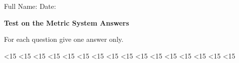 \documentclass{./units4school}
\begin{document}
Full Name: %
\raisebox{-2pt}{\rule[-.4ex]{5cm}{.4pt}}\hfill%
Date: %
\raisebox{-2pt}{\rule[-.4ex]{3cm}{.4pt}}
\hspace*{.5cm}%


\vspace{6mm}
\textbf{\large Test on the Metric System \ifprintanswers \hfill \textcolor{AccentColor}{Answers}
\fi
}%
\vspace{3mm}

For each question give one answer only.








\ifnum\theexerciseID<15 {} \fi
\ifnum\theexerciseID<15 {} \fi
\ifnum\theexerciseID<15 {} \fi
\ifnum\theexerciseID<15 {} \fi
\ifnum\theexerciseID<15 {} \fi
\ifnum\theexerciseID<15 {} \fi
\ifnum\theexerciseID<15 {} \fi
\ifnum\theexerciseID<15 {} \fi
\ifnum\theexerciseID<15 {} \fi
\ifnum\theexerciseID<15 {} \fi
\ifnum\theexerciseID<15 {} \fi
\ifnum\theexerciseID<15 {} \fi
\ifnum\theexerciseID<15 {} \fi
\ifnum\theexerciseID<15 {} \fi
\ifnum\theexerciseID<15 {} \fi
\ifnum\theexerciseID<15 {} \fi
\end{document}
